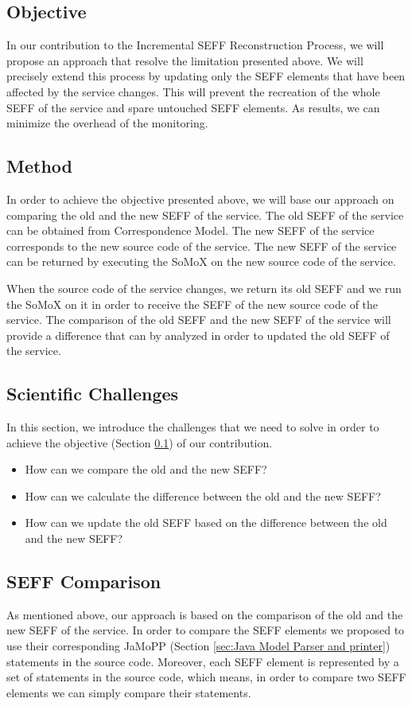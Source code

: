 \subsection{Objective}
\label{sec:objective}
In our contribution to the Incremental SEFF Reconstruction Process, we will propose an approach that resolve the limitation presented above. We will precisely extend this process by updating only the SEFF elements that have been affected by the service changes. This will prevent the recreation of the whole SEFF of the service and spare untouched SEFF elements. As results, we can minimize the overhead of the monitoring. 

\subsection{Method}
\label{sec:Method}
In order to achieve the objective presented above, we will base our approach on comparing the old and the new SEFF of the service. The old SEFF of the service can be obtained from Correspondence Model. The new SEFF of the service corresponds to the new source code of the service. The new SEFF of the service can be returned by executing the SoMoX on the new source code of the service. 

When the source code of the service changes, we return its old SEFF and we run the SoMoX on it in order to receive the SEFF of the new source code of the service. The comparison of the old SEFF and the new SEFF of the service will provide a difference that can by analyzed in order to updated the old SEFF of the service.  

\subsection{Scientific Challenges}
\label{sec:Scientific Challenges}
In this section, we introduce the challenges that we need to solve in order to achieve the objective (Section \ref{sec:objective}) of our contribution. 

\begin{itemize}
\item How can we compare the old and the new SEFF?
\item How can we calculate the difference between the old and the new SEFF?
\item How can we update the old SEFF based on the difference between the old and the new SEFF?
\end{itemize}


\subsection{SEFF Comparison}
\label{sec:SEFF Comparison}
As mentioned above, our approach is based on the comparison of the old and the new SEFF of the service. In order to compare the SEFF elements we proposed to use their corresponding JaMoPP (Section \ref{sec:Java Model Parser and printer}) statements in the source code. Moreover, each SEFF element is represented by a set of statements in the source code, which means, in order to compare two SEFF elements we can simply compare their statements.\\

